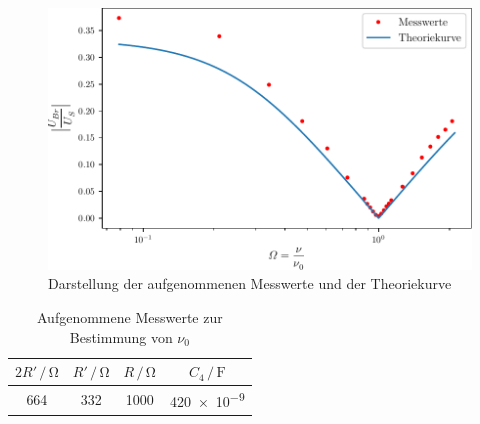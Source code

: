 \begin{figure}[h]
  \centering
  \includegraphics{plot.pdf}
   \caption{Darstellung der aufgenommenen Messwerte und der Theoriekurve}
   \label{fig:plot}
\end{figure}


\begin{table}[h]
\normalsize
\centering
{}
\begin{tabular}{c c c c}
\toprule
        $2R' \,/\,\si{\ohm}$ & $R' \,/\,\si{\ohm}$ & $R \,/\,\si{\ohm}$ & $C_{4} \,/\, \si{\farad}$ \\
        \midrule
        664 & 332 & 1000 & \num{420e-9} \\
\bottomrule
\end{tabular}
\caption{Aufgenommene Messwerte zur Bestimmung von $\nu_{0}$} 
\label{tab:6}
\end{table}


